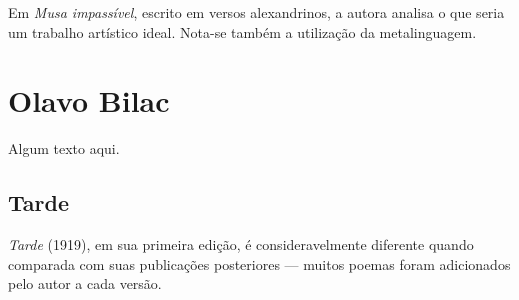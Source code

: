 Em \textit{Musa impassível}, escrito em versos alexandrinos, a autora analisa o que seria um trabalho artístico ideal. Nota-se também a utilização da metalinguagem.

\section{Olavo Bilac}

Algum texto aqui.

\subsection{Tarde}

\textit{Tarde} (1919), em sua primeira edição, é consideravelmente diferente quando comparada com suas publicações posteriores — muitos poemas foram adicionados pelo autor a cada versão. 


